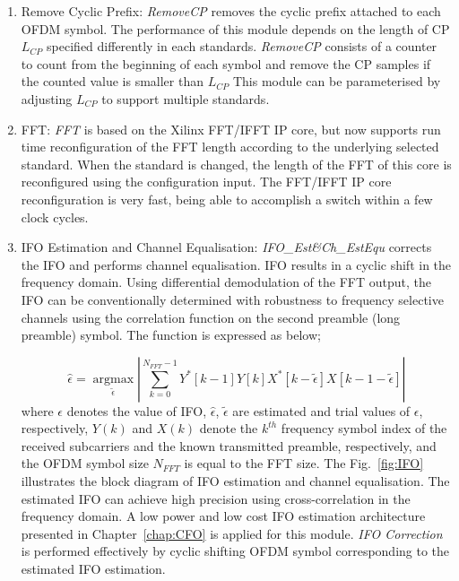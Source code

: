 \begin{enumerate}
\item{Remove Cyclic Prefix:}
\emph{RemoveCP} removes the cyclic prefix attached to each OFDM symbol.
The performance of this module depends on the length of CP $L_{CP}$ specified differently in each standards.
\emph{RemoveCP} consists of a counter to count from the beginning of each symbol and remove the CP samples if the counted value is smaller than $L_{CP}$
This module can be parameterised by adjusting $L_{CP}$ to support multiple standards.

\item{FFT:}
\emph{FFT} is based on the Xilinx FFT/IFFT IP core, but now supports run time reconfiguration of the FFT length according to the underlying selected standard. When the standard is changed, the length of the FFT of this core is reconfigured using the configuration input. The FFT/IFFT IP core reconfiguration is very fast, being able to accomplish a switch within a few clock cycles.

\item{IFO Estimation and Channel Equalisation:}
\emph{IFO\_Est\&Ch\_EstEqu} corrects the IFO and performs channel equalisation. 
IFO results in a cyclic shift in the frequency domain. 
Using differential demodulation of the FFT output, the IFO can be conventionally determined with robustness to frequency selective channels using the correlation function \cite{Park2002} on the second preamble (long preamble) symbol.
The function is expressed as below;

\begin{equation}
\label{integerCFO}
\hat{\epsilon} =\underset{\tilde{\epsilon}}{\operatorname{argmax}}  \left|\sum_{k=0}^{N_{FFT}-1} Y^{*}[k-1] Y[k]  X^{*}[k-\tilde{\epsilon}]  X[k-1-\tilde{\epsilon}]\right|
\end{equation}
where $\epsilon$ denotes the value of IFO, $\hat{\epsilon}$, $\tilde{\epsilon}$ are estimated and trial values of $\epsilon$, respectively,
$Y(k)$ and $X(k)$ denote the $k^{th}$ frequency symbol index of the received subcarriers and the known transmitted preamble, respectively, and the OFDM symbol size $N_{FFT}$ is equal to the FFT size.
The Fig.~\ref{fig:IFO} illustrates the block diagram of IFO estimation and channel equalisation.
The estimated IFO can achieve high precision using cross-correlation in the frequency domain. A low power and low cost IFO estimation architecture presented in Chapter~\ref{chap:CFO} is applied for this module.
\emph{IFO Correction} is performed effectively by cyclic shifting OFDM symbol corresponding to the estimated IFO estimation.


\end{enumerate}
